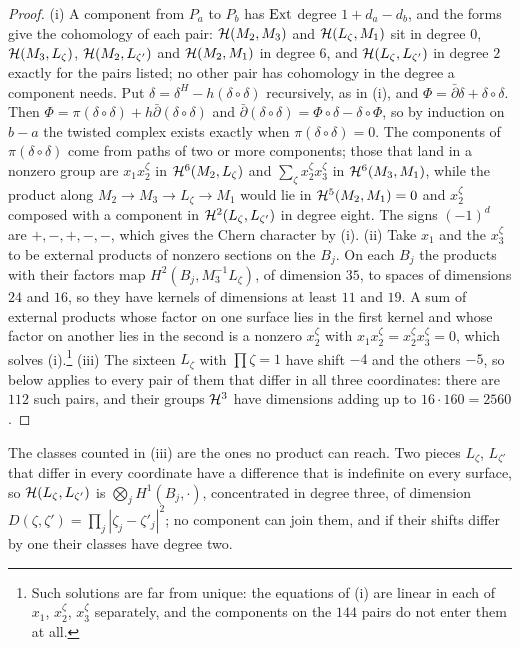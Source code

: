 \begin{proof}
(i) A component from $P_{a}$ to $P_{b}$ has $\operatorname{Ext}$ degree $1+d_{a}-d_{b}$, and
the forms give the cohomology of each pair: $\mathcal{H}(M_{2},M_{3})$ and
$\mathcal{H}(L_{\zeta},M_{1})$ sit in degree $0$, $\mathcal{H}(M_{3},L_{\zeta})$,
$\mathcal{H}(M_{2},L_{\zeta'})$ and $\mathcal{H}(M_{2},M_{1})$ in degree $6$, and
$\mathcal{H}(L_{\zeta},L_{\zeta'})$ in degree $2$ exactly for the pairs listed; no
other pair has cohomology in the degree a component needs. Put
$\delta=\delta^{H}-h(\delta\circ\delta)$ recursively, as in
(i), and $\Phi=\bar\partial\delta+\delta\circ\delta$.
Then $\Phi=\pi(\delta\circ\delta)+h\bar\partial(\delta\circ\delta)$ and
$\bar\partial(\delta\circ\delta)=\Phi\circ\delta-\delta\circ\Phi$, so by
induction on $b-a$ the twisted complex exists exactly when
$\pi(\delta\circ\delta)=0$. The components of $\pi(\delta\circ\delta)$ come
from paths of two or more components; those that land in a nonzero group
are $x_{1}x_{2}^{\zeta}$ in $\mathcal{H}^{6}(M_{2},L_{\zeta})$ and
$\sum_{\zeta}x_{2}^{\zeta}x_{3}^{\zeta}$ in $\mathcal{H}^{6}(M_{3},M_{1})$, while the
product along $M_{2}\to M_{3}\to L_{\zeta}\to M_{1}$ would lie in
$\mathcal{H}^{5}(M_{2},M_{1})=0$ and $x_{2}^{\zeta}$ composed with a component in
$\mathcal{H}^{2}(L_{\zeta},L_{\zeta'})$ in degree eight. The signs
$(-1)^{d}$ are $+,-,+,-,-$, which gives the Chern character by
(i).
(ii) Take $x_{1}$ and the $x_{3}^{\zeta}$ to be external products of
nonzero sections on the $B_{j}$. On each $B_{j}$ the products with their
factors map $H^{2}(B_{j},M_{3}^{-1}L_{\zeta})$, of dimension $35$, to spaces
of dimensions $24$ and $16$, so they have kernels of dimensions at least $11$
and $19$. A sum of external products whose factor on one surface lies in the
first kernel and whose factor on another lies in the second is a nonzero
$x_{2}^{\zeta}$ with $x_{1}x_{2}^{\zeta}=x_{2}^{\zeta}x_{3}^{\zeta}=0$, which
solves (i).\footnote{Such solutions are far from unique: the equations of
(i) are linear in each of $x_{1}$, $x_{2}^{\zeta}$, $x_{3}^{\zeta}$
separately, and the components on the $144$ pairs do not enter them at
all.}
(iii) The sixteen $L_{\zeta}$ with $\prod\zeta=1$ have shift $-4$ and the
others $-5$, so  below applies to every pair of them
that differ in all three coordinates: there are $112$ such pairs, and their
groups $\mathcal{H}^{3}$ have dimensions adding up to $16\cdot160=2560$.
\end{proof}

The classes counted in (iii) are the ones no product can reach. Two pieces
$L_{\zeta}$, $L_{\zeta'}$ that differ in every coordinate have a difference
that is indefinite on every surface, so $\mathcal{H}(L_{\zeta},L_{\zeta'})$ is
$\bigotimes_{j}H^{1}(B_{j},\cdot)$, concentrated in degree three, of
dimension $D(\zeta,\zeta')=\prod_{j}|\zeta_{j}-\zeta'_{j}|^{2}$; no component
can join them, and if their shifts differ by one their classes have degree
two.

